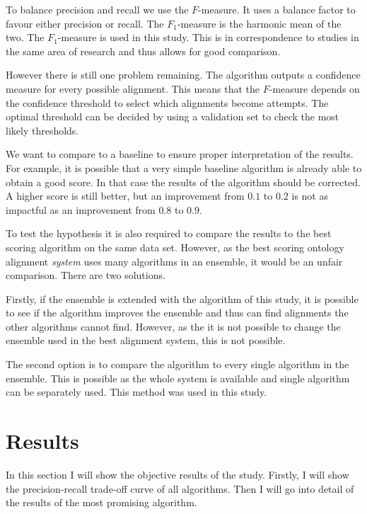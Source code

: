 \documentclass{article}
\begin{document}
 To balance precision and recall we use the $F$-measure. It uses a balance factor to favour either precision or recall. The $F_1$-measure is the harmonic mean of the two. The $F_1$-measure is used in this study. This is in correspondence to studies in the same area of research and thus allows for good comparison.
 
 However there is still one problem remaining. The algorithm outputs a confidence measure for every possible alignment. This means that the $F$-measure depends on the confidence threshold to select which alignments become attempts. The optimal threshold can be decided by using a validation set to check the most likely thresholds.
 
 We want to compare to a baseline to ensure proper interpretation of the results. For example, it is possible that a very simple baseline algorithm is already able to obtain a good score. In that case the results of the algorithm should be corrected. A higher score is still better, but an improvement from $0.1$ to $0.2$ is not as impactful as an improvement from $0.8$ to $0.9$. 
 
 To test the hypothesis it is also required to compare the results to the best scoring algorithm on the same data set. However, as the best scoring ontology alignment \textit{system} uses many algorithms in an ensemble, it would be an unfair comparison. There are two solutions. 
 
 Firstly, if the ensemble is extended with the algorithm of this study, it is possible to see if the algorithm improves the ensemble and thus can find alignments the other algorithms cannot find.
 However, as the it is not possible to change the ensemble used in the best alignment system, this is not possible.
 
 The second option is to compare the algorithm to every single algorithm in the ensemble. This is possible as the whole system is available and single algorithm can be separately used. This method was used in this study.
 
 \newpage
 \section{Results} \label{results}
 
 In this section I will show the objective results of the study. Firstly, I will show the precision-recall trade-off curve of all algorithms. Then I will go into detail of the results of the most promising algorithm.
 
\end{document}
